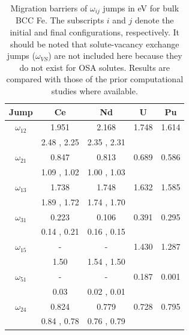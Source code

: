 \documentclass[preprint,12pt]{elsarticle}
\begin{document}
\begin{table}[!ht]
    \centering
    \caption{Migration barriers of $\omega_{ij}$ jumps in eV for bulk BCC Fe. The subscripts $i$ and $j$ denote the initial and final configurations, respectively. It should be noted that solute-vacancy exchange jumps ($\omega_{VS}$) are not included here because they do not exist for OSA solutes. Results are compared with those of the prior computational studies \cite{yang_significant_2023, ke2025diffusion} where available.}
    \footnotesize \label{tab:migration_barriers}
    \begin{tabular}{|c|c|c|c|c|}
      \hline
      Jump &Ce &Nd &U  &Pu  \\
      \hline
       $\omega_{12}$  &1.951 &2.168 &1.748 &1.614 \\
       &2.48 \cite{yang_significant_2023}, 2.25 \cite{ke2025diffusion}& 2.35 \cite{yang_significant_2023}, 2.31 \cite{ke2025diffusion}&&\\
       \hline
       $\omega_{21}$  &0.847 &0.813 &0.689 &0.586 \\
       &1.09 \cite{yang_significant_2023}, 1.02 \cite{ke2025diffusion}& 1.00 \cite{yang_significant_2023}, 1.03 \cite{ke2025diffusion}&&\\
       \hline
       $\omega_{13}$  &1.738 &1.748 &1.632 &1.585 \\
       &1.89 \cite{yang_significant_2023}, 1.72 \cite{ke2025diffusion}& 1.74 \cite{yang_significant_2023}, 1.70 \cite{ke2025diffusion}&&\\
       \hline
       $\omega_{31}$  &0.223 &0.106 &0.391 &0.295 \\
       &0.14 \cite{yang_significant_2023}, 0.21 \cite{ke2025diffusion}& 0.16 \cite{yang_significant_2023}, 0.15 \cite{ke2025diffusion}&&\\
       \hline
       $\omega_{15}$  &- &- &1.430 &1.287 \\ 
       &1.50 \cite{ke2025diffusion}& 1.54 \cite{yang_significant_2023}, 1.50 \cite{ke2025diffusion}&&\\
       \hline
       $\omega_{51}$  &- &- &0.187 &0.001 \\
       &0.03 \cite{ke2025diffusion}& 0.02 \cite{yang_significant_2023}, 0.01 \cite{ke2025diffusion}&&\\
       \hline
       $\omega_{24}$  &0.824 &0.779 &0.728 &0.795 \\ 
       &0.84 \cite{yang_significant_2023}, 0.78 \cite{ke2025diffusion} & 0.76 \cite{yang_significant_2023}, 0.79 \cite{ke2025diffusion}&&\\

\end{tabular}
\end{table}
\end{document}
